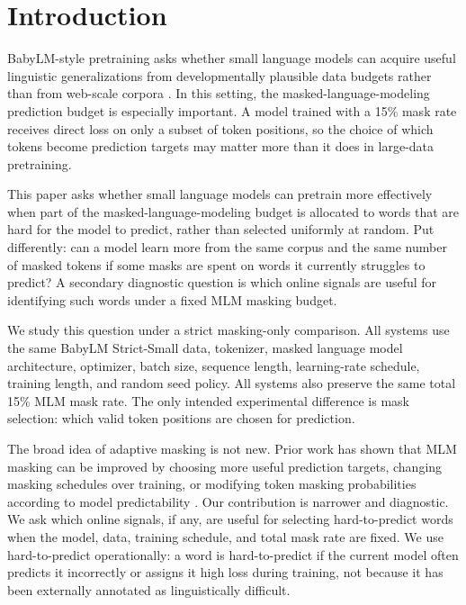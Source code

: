 \section{Introduction}

BabyLM-style pretraining asks whether small language models can acquire useful linguistic generalizations from developmentally plausible data budgets rather than from web-scale corpora \citep{warstadt2023babylm,hu2024babylm,choshen2026babylm}. In this setting, the masked-language-modeling prediction budget is especially important. A model trained with a 15\% mask rate receives direct loss on only a subset of token positions, so the choice of which tokens become prediction targets may matter more than it does in large-data pretraining.

This paper asks whether small language models can pretrain more effectively when part of the masked-language-modeling budget is allocated to words that are hard for the model to predict, rather than selected uniformly at random. Put differently: can a model learn more from the same corpus and the same number of masked tokens if some masks are spent on words it currently struggles to predict? A secondary diagnostic question is which online signals are useful for identifying such words under a fixed MLM masking budget.

We study this question under a strict masking-only comparison. All systems use the same BabyLM Strict-Small data, tokenizer, masked language model architecture, optimizer, batch size, sequence length, learning-rate schedule, training length, and random seed policy. All systems also preserve the same total 15\% MLM mask rate. The only intended experimental difference is mask selection: which valid token positions are chosen for prediction.

The broad idea of adaptive masking is not new. Prior work has shown that MLM masking can be improved by choosing more useful prediction targets, changing masking schedules over training, or modifying token masking probabilities according to model predictability \citep{gu2020train,lee2022efficient,yang2023learning,zhong2023self,wilf2023difference,edman2025mask}. Our contribution is narrower and diagnostic. We ask which online signals, if any, are useful for selecting hard-to-predict words when the model, data, training schedule, and total mask rate are fixed. We use hard-to-predict operationally: a word is hard-to-predict if the current model often predicts it incorrectly or assigns it high loss during training, not because it has been externally annotated as linguistically difficult.

